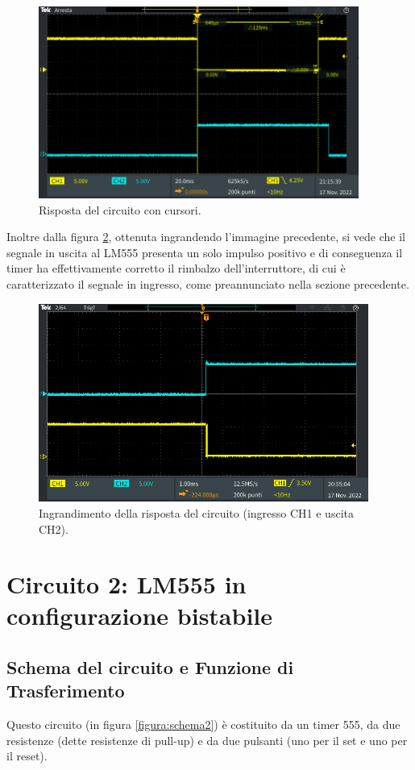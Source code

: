 \documentclass{report}
\begin{document}
\begin{figure}[h!]
	\centering
	\includegraphics[height=6.3cm]{immagini/TEK00010}
	\caption{Risposta del circuito con cursori.}
	\label{figura:TEK00010}
\end{figure}

\noindent Inoltre dalla figura \ref{figura:TEK00009}, ottenuta ingrandendo l'immagine precedente, si vede che il segnale in uscita al LM555 presenta un solo impulso positivo e di conseguenza il timer ha effettivamente corretto il rimbalzo dell'interruttore, di cui è caratterizzato il segnale in ingresso, come preannunciato nella sezione precedente.

\begin{figure}[h!]
	\centering
	\includegraphics[height=6.5cm]{immagini/TEK00009}
	\caption{Ingrandimento della risposta del circuito (ingresso CH1 e uscita CH2).}
	\label{figura:TEK00009}
\end{figure}

\newpage
\section{Circuito 2: LM555 in configurazione bistabile}\label{sez2}
\subsection{Schema del circuito e Funzione di Trasferimento}
Questo circuito (in figura \ref{figura:schema2}) è costituito da un timer 555, da due resistenze (dette resistenze di pull-up) e da due pulsanti (uno per il set e uno per il reset).
\end{document}
